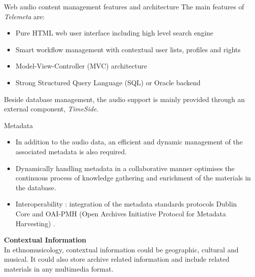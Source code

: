 \documentclass[final, hyperref, table]{beamer}
\begin{document}
\begin{frame}[containsverbatim]{}
\begin{columns}[T]
\begin{column}[T]{.49\linewidth}
\begin{block}{Web audio content management features and architecture}
        The main features of \emph{Telemeta} are:
        \vspace{-0.1cm}
        \begin{itemize}
        \item \alert{Pure HTML} web user interface including high level \alert{search engine}
        \item \alert{Smart workflow management} with contextual user lists, profiles and rights
        \item Model-View-Controller (\alert{MVC}) architecture 
        \item Strong Structured Query Language (\alert{SQL}) or Oracle backend
        \end{itemize}
        Beside database management, the audio support is mainly provided through an external component, \emph{TimeSide}.
        
      \end{block}
      \begin{block}{Metadata}
        \vspace{-0.5cm}
        \begin{itemize}
        \item In addition to the audio data, an efficient and \alert{dynamic
            management} of the associated metadata is also required.
        \item Dynamically handling metadata in a \alert{collaborative} manner optimises
          the continuous process of knowledge gathering and enrichment of
          the materials in the database.
        \item Interoperability : integration of the metadata standards protocols \alert{Dublin Core}
          and \alert{OAI-PMH} (Open Archives Initiative Protocol for Metadata
          Harvesting) \cite{DublinCore,OAI-PMH}.
        \end{itemize}
        
        \textbf{Contextual Information}\\
        In ethnomusicology, contextual information could be geographic, cultural and musical. It could also store archive related information and include related materials in any multimedia format. 
        

\end{block}
\end{column}
\end{columns}
\end{frame}
\end{document}

